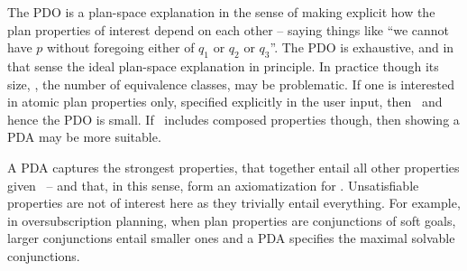 %

The PDO is a plan-space explanation in the sense of making explicit
how the plan properties of interest depend on each other -- saying
things like ``we cannot have $p$ without foregoing either of $q_1$ or
$q_2$ or $q_3$''. The PDO is exhaustive, and in that sense the ideal
plan-space explanation in principle. In practice though its size, \ie,
the number of equivalence classes, may be problematic. If one is
interested in atomic plan properties only, specified explicitly in the
user input, then \props\ and hence the PDO is small. If
\props\ includes composed properties though, then showing a PDA may be
more suitable.

A PDA captures the strongest properties, that together entail all
other properties given \plans\ -- and that, in this sense, form an
axiomatization for \plans. Unsatisfiable properties are not of
interest here as they trivially entail everything. For example, in
oversubscription planning, when plan properties are conjunctions of
soft goals, larger conjunctions entail smaller ones and a PDA
specifies the maximal solvable conjunctions.

%

